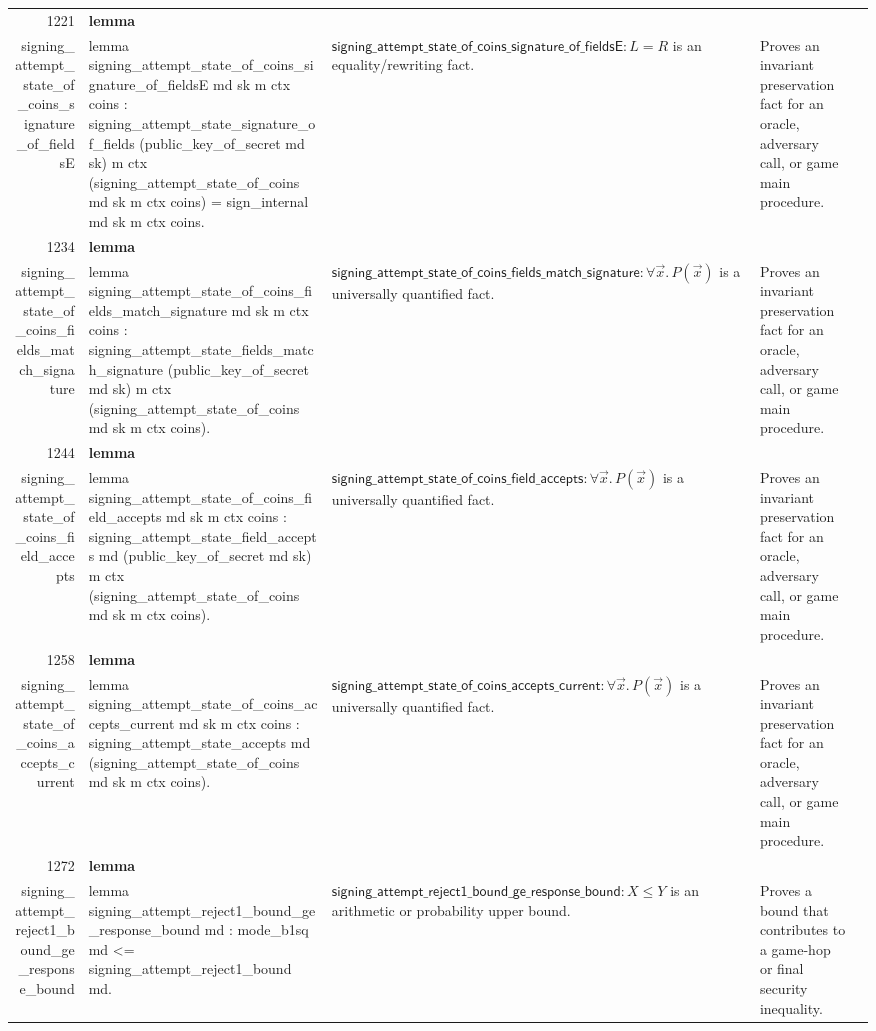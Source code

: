 \documentclass[10pt]{article}
\newcommand{\ec}[1]{\begingroup\ttfamily\scriptsize #1\endgroup}
\begin{document}
\begin{longtable}{r L{0.17\textwidth} L{0.26\textwidth} L{0.27\textwidth} L{0.20\textwidth}}
1221 & \textbf{lemma}\\\ec{signing\_attempt\_state\_of\_coins\_signature\_of\_fieldsE} & \ec{lemma signing\_attempt\_state\_of\_coins\_signature\_of\_fieldsE md sk m ctx coins : signing\_attempt\_state\_signature\_of\_fields (public\_key\_of\_secret md sk) m ctx (signing\_attempt\_state\_of\_coins md sk m ctx coins) = sign\_internal md sk m ctx coins.} & \(\mathsf{signing\_attempt\_state\_of\_coins\_signature\_of\_fieldsE} : L = R\) is an equality/rewriting fact. & Proves an invariant preservation fact for an oracle, adversary call, or game main procedure. \\
1234 & \textbf{lemma}\\\ec{signing\_attempt\_state\_of\_coins\_fields\_match\_signature} & \ec{lemma signing\_attempt\_state\_of\_coins\_fields\_match\_signature md sk m ctx coins : signing\_attempt\_state\_fields\_match\_signature (public\_key\_of\_secret md sk) m ctx (signing\_attempt\_state\_of\_coins md sk m ctx coins).} & \(\mathsf{signing\_attempt\_state\_of\_coins\_fields\_match\_signature} : \forall \vec{x}.\, P(\vec{x})\) is a universally quantified fact. & Proves an invariant preservation fact for an oracle, adversary call, or game main procedure. \\
1244 & \textbf{lemma}\\\ec{signing\_attempt\_state\_of\_coins\_field\_accepts} & \ec{lemma signing\_attempt\_state\_of\_coins\_field\_accepts md sk m ctx coins : signing\_attempt\_state\_field\_accepts md (public\_key\_of\_secret md sk) m ctx (signing\_attempt\_state\_of\_coins md sk m ctx coins).} & \(\mathsf{signing\_attempt\_state\_of\_coins\_field\_accepts} : \forall \vec{x}.\, P(\vec{x})\) is a universally quantified fact. & Proves an invariant preservation fact for an oracle, adversary call, or game main procedure. \\
1258 & \textbf{lemma}\\\ec{signing\_attempt\_state\_of\_coins\_accepts\_current} & \ec{lemma signing\_attempt\_state\_of\_coins\_accepts\_current md sk m ctx coins : signing\_attempt\_state\_accepts md (signing\_attempt\_state\_of\_coins md sk m ctx coins).} & \(\mathsf{signing\_attempt\_state\_of\_coins\_accepts\_current} : \forall \vec{x}.\, P(\vec{x})\) is a universally quantified fact. & Proves an invariant preservation fact for an oracle, adversary call, or game main procedure. \\
1272 & \textbf{lemma}\\\ec{signing\_attempt\_reject1\_bound\_ge\_response\_bound} & \ec{lemma signing\_attempt\_reject1\_bound\_ge\_response\_bound md : mode\_b1sq md <= signing\_attempt\_reject1\_bound md.} & \(\mathsf{signing\_attempt\_reject1\_bound\_ge\_response\_bound} : X \le Y\) is an arithmetic or probability upper bound. & Proves a bound that contributes to a game-hop or final security inequality. \\

\end{longtable}
\end{document}
